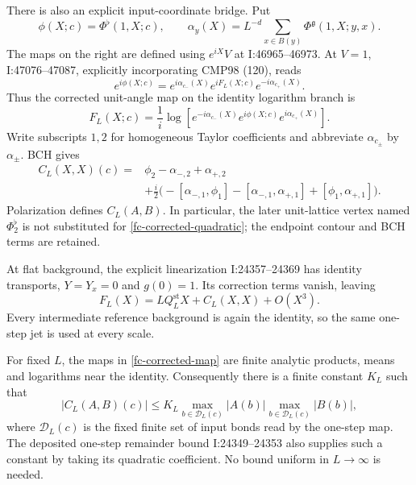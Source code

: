 \documentclass[11pt]{article}
\theoremstyle{remark}\newtheorem{remark}[theorem]{Remark}
\begin{document}
There is also an explicit input-coordinate bridge. Put
\[
 \phi(X;c)=\Phi^{\flat}(1,X;c),\qquad
 \alpha_y(X)=L^{-d}\sum_{x\in B(y)}
                  \Phi^{\mathfrak g}(1,X;y,x).
\]
The maps on the right are defined using $e^{iX}V$ at
I:46965--46973. At $V=1$, I:47076--47087, explicitly incorporating
CMP98 (120), reads
\[
 e^{i\phi(X;c)}=e^{i\alpha_{c_-}(X)}e^{iF_L(X;c)}
                                  e^{-i\alpha_{c_+}(X)}.
\]
Thus the corrected unit-angle map on the identity logarithm branch is
\begin{equation}
 F_L(X;c)=\frac1i\log\!\left[
 e^{-i\alpha_{c_-}(X)}e^{i\phi(X;c)}e^{i\alpha_{c_+}(X)}\right].
 \label{fc-corrected-map}
\end{equation}
Write subscripts $1,2$ for homogeneous Taylor coefficients and
abbreviate $\alpha_{c_\pm}$ by $\alpha_\pm$. BCH gives
\begin{equation}
 \begin{split}
 C_L(X,X)(c)={}&\phi_2-\alpha_{-,2}+\alpha_{+,2}\\
 &+\frac i2\bigl(-[\alpha_{-,1},\phi_1]
                 -[\alpha_{-,1},\alpha_{+,1}]
                 +[\phi_1,\alpha_{+,1}]\bigr).
 \end{split}
 \label{fc-corrected-quadratic}
\end{equation}
Polarization defines $C_L(A,B)$. In particular, the later
unit-lattice vertex named $\Phi^{\flat}_2$ is not substituted for
\eqref{fc-corrected-quadratic}; the endpoint contour and BCH terms
are retained.

At flat background, the explicit linearization I:24357--24369 has
identity transports, $Y=Y_x=0$ and $g(0)=1$. Its correction terms
vanish, leaving
\begin{equation}
 F_L(X)=LQ_L^{\mathrm{st}}X+C_L(X,X)+O(X^3).
 \label{fc-unit-jet}
\end{equation}
Every intermediate reference background is again the identity, so
the same one-step jet is used at every scale.

For fixed $L$, the maps in \eqref{fc-corrected-map} are finite
analytic products, means and logarithms near the identity.
Consequently there is a finite constant $K_L$ such that
\begin{equation}
 |C_L(A,B)(c)|\le K_L
       \max_{b\in\mathcal D_L(c)}|A(b)|
       \max_{b\in\mathcal D_L(c)}|B(b)|,
 \label{fc-one-step-coefficient}
\end{equation}
where $\mathcal D_L(c)$ is the fixed finite set of input bonds read
by the one-step map. The deposited one-step remainder bound
I:24349--24353 also supplies such a constant by taking its quadratic
coefficient. No bound uniform in $L\to\infty$ is needed.
\end{document}
